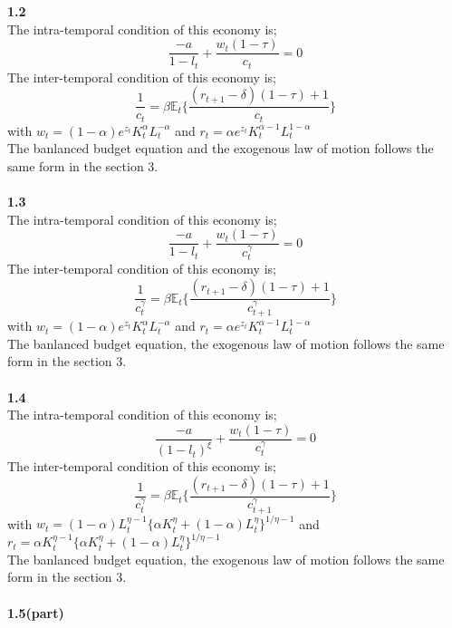 \documentclass[letterpaper,12pt]{article}
\theoremstyle{definition}
\begin{document}
\begin{spacing}{1.3}{}
\noindent\textbf{1.2}\\

The intra-temporal condition of this economy is;
\[\frac{-a}{1-l_t} + \frac{w_t (1-\tau)}{c_t} = 0  \]
The inter-temporal condition of this economy is;
\[\frac{1}{c_t}  = \beta \mathbb{E}_t \{ \frac{(r_{t+1} - \delta)(1-\tau) + 1}{c_t} \} \]
with $w_t = (1-\alpha) e^{z_t} K_{t}^{\alpha} L_{t}^{-\alpha} $ and $r_t= \alpha e^{z_t} K_{t}^{\alpha-1} L_{t}^{1-\alpha}$ \\
The banlanced budget equation and the exogenous law of motion follows the same form in the section 3. \\\\

\noindent\textbf{1.3}\\

The intra-temporal condition of this economy is;
\[\frac{-a}{1-l_t} + \frac{w_t (1-\tau)}{c_{t}^{\gamma}} = 0  \]
The inter-temporal condition of this economy is;
\[\frac{1}{c_{t}^{\gamma}}  = \beta \mathbb{E}_t \{ \frac{(r_{t+1} - \delta)(1-\tau) + 1}{c_{t+1}^{\gamma}} \} \]
with $w_t = (1-\alpha) e^{z_t} K_{t}^{\alpha} L_{t}^{-\alpha} $ and $r_t= \alpha e^{z_t} K_{t}^{\alpha-1} L_{t}^{1-\alpha}$ \\
The banlanced budget equation, the exogenous law of motion follows the same form in the section 3. \\\\
\noindent\textbf{1.4}\\

The intra-temporal condition of this economy is;
\[\frac{-a}{(1-l_t)^{\xi}} + \frac{w_t (1-\tau)}{c_{t}^{\gamma}} = 0  \]
The inter-temporal condition of this economy is;
\[\frac{1}{c_{t}^{\gamma}}  = \beta \mathbb{E}_t \{ \frac{(r_{t+1} - \delta)(1-\tau) + 1}{c_{t+1}^{\gamma}} \} \]
with $w_t = (1-\alpha) L_{t}^{\eta -1} \{ \alpha K_{t}^{\eta} + (1-\alpha) L_{t}^{\eta} \}^{1/\eta -1} $ and $r_t= \alpha K_{t}^{\eta -1} \{ \alpha K_{t}^{\eta} + (1-\alpha) L_{t}^{\eta} \}^{1/\eta -1}$ \\
The banlanced budget equation, the exogenous law of motion follows the same form in the section 3. \\\\
\noindent\textbf{1.5(part)}\\


\end{spacing}
\end{document}
